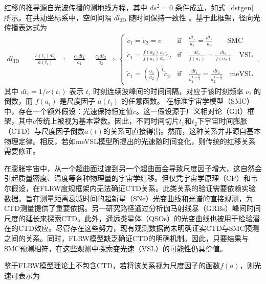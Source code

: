 \documentclass[jkps,preprint,fleqn]{revtex4}
\newcommand{\tc}{\tilde{c}}
\begin{document}
\begin{CJK*}{UTF8}{gbsn}
红移的推导源自光波传播的测地线方程，其中 $ds^2 = 0$ 条件成立，如式~\eqref{dstgen} 所示。在共动坐标系中，空间间隔 $dl_{3\textrm{D}}$ 随时间保持一致性 \cite{Lee:2024mal,Lee:2024zcu}。基于此框架，径向光传播表达式为
\begin{align}
d l_{3\textrm{D}} &= \frac{c(t_i) dt_i}{a(t_i)} \quad : \quad \frac{\tc_1 dt_1}{a_1} = \frac{\tc_2 dt_2}{a_2} \Rightarrow \begin{cases} \tc_1 = \tc_2 = c & \textrm{if} \quad \frac{dt_1}{a_1} = \frac{dt_2}{a_2} \qquad \textrm{SMC} \\
\tc_1 = \frac{f(a_2)}{f(a_1)} \frac{a_1}{a_2} \tc_2 & \textrm{if} \quad \frac{dt_1}{f(a_1)} = \frac{dt_2}{f(a_2)} \quad \textrm{VSL} \\ \tc_1 = \left( \frac{a_1}{a_2}\right)^{\frac{b}{4}} \tc_2 & \textrm{if} \quad \frac{dt_1}{a_1^{1-\frac{b}{4}}} = \frac{dt_2}{a_2^{1-\frac{b}{4}}} \quad \textrm{meVSL}  \end{cases} \,, \label{dl3D}
\end{align}
其中 $dt_i = 1/\nu(t_i)$ 表示 $t_i$ 时刻连续波峰间的时间间隔，对应于该时刻频率 $\nu_i$ 的倒数，而 $f(a_i)$ 是尺度因子 $a(t_i)$ 的任意函数。
在标准宇宙学模型（SMC）中，存在一个额外假设：光速保持恒定值$c$。这一假设源于广义相对论（GR）框架，其中$c$传统上被视为基本常数。因此，不同时间切片$t_1$和$t_2$下宇宙时间膨胀（CTD）与尺度因子倒数$a(t)$的关系可直接得出。然而，这种关系并非源自基本物理定律。相反，若如meVSL模型所提出的光速随时间变化，则传统的红移关系需要修正。

在膨胀宇宙中，从一个超曲面过渡到另一个超曲面会导致尺度因子增大，这自然会引起质量密度、温度等各种物理量的宇宙学红移。但仅凭宇宙学原理（CP）和韦尔假设，在FLRW度规框架内无法确证CTD关系。此类关系的验证需要依赖实验数据。旨在测量距离衰减时间的超新星（SNe）光变曲线和光谱的直接观测，为CTD测量提供了重要依据\cite{Leibundgut:1996qm,SupernovaSearchTeam:1997gem,Foley:2005qu,Blondin:2007ua,Blondin:2008mz,Lee:2023ucu,DES:2024vgg,Lee:2024kxa}。另一研究路径通过分析伽马射线暴（GRBs）峰间时间尺度的延长来探索CTD\cite{Norris:1993hda,Wijers:1994qf,Band:1994ee,Meszaros:1995gj,Lee:1996zu,Chang:2001fy,Crawford:2009be,Zhang:2013yna,Singh:2021jgr}。此外，遥远类星体（QSOs）的光变曲线也被用于检验潜在的CTD效应\cite{Hawkins:2001be,Dai:2012wp,Lewis:2023jab}。尽管存在这些努力，现有观测数据尚未明确证实CTD与SMC预测之间的关系。同时，FLRW模型缺乏确证CTD的明确机制。因此，只要结果与SMC预测相符，在这些观测中探索变光速（VSL）的可能性仍具价值。

鉴于FLRW模型理论上不包含CTD，若将该关系视为尺度因子的函数$f(a)$，则光速可表示为


\end{CJK*}
\end{document}
